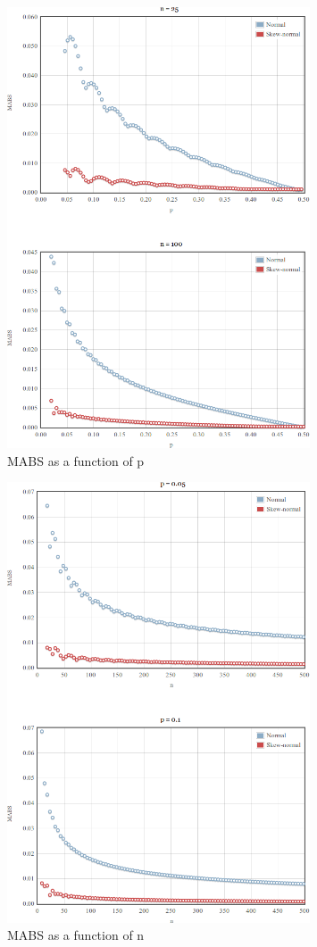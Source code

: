 \documentclass{article}
\begin{document}
\begin{figure}
  \centering
  \includegraphics[width=0.8\textwidth]{../images/mabs-fixed-n.png}
  \caption{MABS as a function of p}
  \label{fig:mabs-fixed-n}
\end{figure}

\begin{figure}
  \centering
  \includegraphics[width=0.8\textwidth]{../images/mabs-fixed-p.png}
  \caption{MABS as a function of n}
  \label{fig:mabs-fixed-p}
\end{figure}
\end{document}
